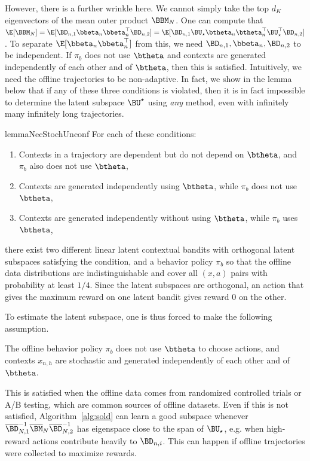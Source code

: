 However, there is a further wrinkle here. We cannot simply take the top $d_K$ eigenvectors of the mean outer product $\BBM_N$. One can compute that $\E[\BBM_N] = \E[\BD_{n,1} \bbeta_{n} \bbeta_{n}^\top \BD_{n,2}] = \E[\BD_{n,1} \BU_\star \btheta_{n}  \btheta_{n}^\top \BU_\star^\top \BD_{n,2}]$. To separate $\E[\bbeta_n\bbeta_n^\top]$ from this, we need $\BD_{n,1}, \bbeta_n, \BD_{n,2}$ to be independent. If $\pi_b$ does not use $\btheta$ and contexts are generated independently of each other and of $\btheta$, then this is satisfied. Intuitively, we need the offline trajectories to be non-adaptive. In fact, we show in the lemma below that if any of these three conditions is violated, then it is in fact impossible to determine the latent subspace $\BU^\star$ using \textit{any} method, even with infinitely many infinitely long trajectories. 

\begin{restatable}{lemma}{NecStochUnconf}
For each of these conditions:
\begin{enumerate}  
    \item Contexts in a trajectory are dependent but do not depend on $\btheta$, and $\pi_b$ also does not use $\btheta$,
    \item Contexts are generated independently using $\btheta$, while $\pi_b$ does not use $\btheta$,
    \item Contexts are generated independently without using $\btheta$, while $\pi_b$ uses $\btheta$,
\end{enumerate}
there exist two different linear latent contextual bandits with orthogonal latent subspaces satisfying the condition, and a behavior policy $\pi_b$ so that the offline data distributions are indistinguishable and cover all $(x,a)$ pairs with probability at least $1/4$. Since the latent subspaces are orthogonal, an action that gives the maximum reward on one latent bandit gives reward $0$ on the other.
\end{restatable}
To estimate the latent subspace, one is thus forced to make the following assumption.
\begin{assumption}\label{assum:unconf-offline-actions}
    The offline behavior policy $\pi_b$ does not use $\btheta$ to choose actions, and contexts $x_{n,h}$ are stochastic and generated independently of each other and of $\btheta$. 
\end{assumption}
This is satisfied when the offline data comes from randomized controlled trials or A/B testing, which are common sources of offline datasets. Even if this is not satisfied, Algorithm~\ref{alg:sold} can learn a good subspace whenever $\overline{\BD}_{N,1}^{-1} {\overline{\BM}_N} {\overline{\BD}_{N,2}^{-1}}$ has eigenspace close to the span of $\BU_\star$, e.g. when high-reward actions contribute heavily to $\BD_{n,i}$. This can happen if offline trajectories were collected to maximize rewards. 


